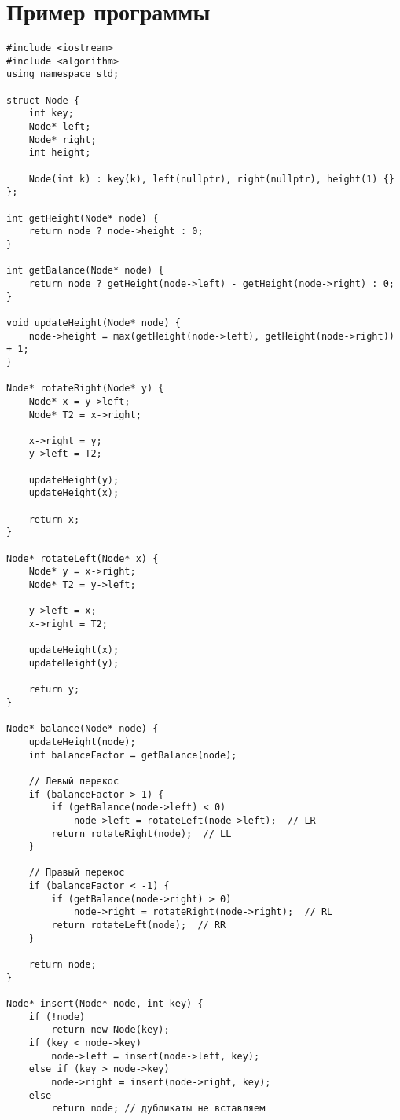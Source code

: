 \documentclass[otchet]{SCWorks}
\begin{document}
\section{Пример программы}
\begin{verbatim}
#include <iostream>
#include <algorithm>
using namespace std;

struct Node {
    int key;
    Node* left;
    Node* right;
    int height;

    Node(int k) : key(k), left(nullptr), right(nullptr), height(1) {}
};

int getHeight(Node* node) {
    return node ? node->height : 0;
}

int getBalance(Node* node) {
    return node ? getHeight(node->left) - getHeight(node->right) : 0;
}

void updateHeight(Node* node) {
    node->height = max(getHeight(node->left), getHeight(node->right)) + 1;
}

Node* rotateRight(Node* y) {
    Node* x = y->left;
    Node* T2 = x->right;

    x->right = y;
    y->left = T2;

    updateHeight(y);
    updateHeight(x);

    return x;
}

Node* rotateLeft(Node* x) {
    Node* y = x->right;
    Node* T2 = y->left;

    y->left = x;
    x->right = T2;

    updateHeight(x);
    updateHeight(y);

    return y;
}

Node* balance(Node* node) {
    updateHeight(node);
    int balanceFactor = getBalance(node);

    // Левый перекос
    if (balanceFactor > 1) {
        if (getBalance(node->left) < 0)
            node->left = rotateLeft(node->left);  // LR
        return rotateRight(node);  // LL
    }

    // Правый перекос
    if (balanceFactor < -1) {
        if (getBalance(node->right) > 0)
            node->right = rotateRight(node->right);  // RL
        return rotateLeft(node);  // RR
    }

    return node;
}

Node* insert(Node* node, int key) {
    if (!node)
        return new Node(key);
    if (key < node->key)
        node->left = insert(node->left, key);
    else if (key > node->key)
        node->right = insert(node->right, key);
    else
        return node; // дубликаты не вставляем


\end{verbatim}
\end{document}
